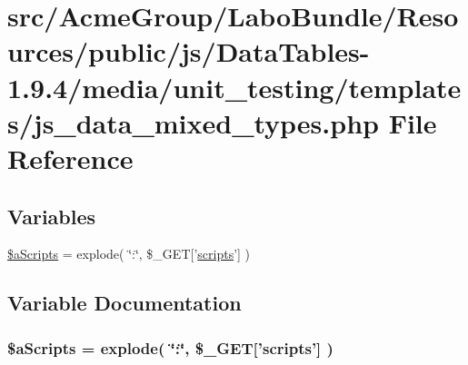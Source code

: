 \hypertarget{js__data__mixed__types_8php}{\section{src/\+Acme\+Group/\+Labo\+Bundle/\+Resources/public/js/\+Data\+Tables-\/1.9.4/media/unit\+\_\+testing/templates/js\+\_\+data\+\_\+mixed\+\_\+types.php File Reference}
\label{js__data__mixed__types_8php}
}
\subsection*{Variables}
\begin{DoxyCompactItemize}
\item 
\hyperlink{js__data__mixed__types_8php_a3e8e1608000c9afdd05327fc2b06b056}{\$a\+Scripts} = explode( \char`\"{}\+:\char`\"{}, \$\+\_\+\+G\+E\+T\mbox{[}'\hyperlink{tinymce_8jquery_8dev_8js_a09066d4d580eeec222f858d588b4cdef}{scripts}'\mbox{]} )
\end{DoxyCompactItemize}


\subsection{Variable Documentation}
\hypertarget{js__data__mixed__types_8php_a3e8e1608000c9afdd05327fc2b06b056}{
\subsubsection[{\$a\+Scripts}]{\setlength{\rightskip}{0pt plus 5cm}\$a\+Scripts = explode( \char`\"{}\+:\char`\"{}, \$\+\_\+\+G\+E\+T\mbox{[}'{\bf scripts}'\mbox{]} )}}\label{js__data__mixed__types_8php_a3e8e1608000c9afdd05327fc2b06b056}
